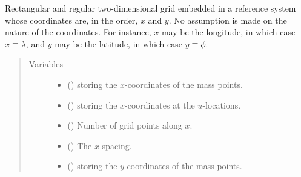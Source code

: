 \documentclass[letterpaper,10pt,english]{sphinxmanual}
\begin{document}
\begin{fulllineitems}
\label{\detokenize{api:grids.grid_xy.GridXY}}
Rectangular and regular two-dimensional grid embedded in a reference system whose coordinates are,
in the order, \(x\) and \(y\). No assumption is made on the nature of the coordinates. For
instance, \(x\) may be the longitude, in which case \(x \equiv \lambda\), and \(y\) may
be the latitude, in which case \(y \equiv \phi\).
\begin{quote}\begin{description}
\item[{Variables}] \leavevmode\begin{itemize}
\item {} 
{\hyperref[\detokenize{api:grids.grid_xyz.GridXYZ.x}]{}} () \textendash{} {\hyperref[\detokenize{api:grids.axis.Axis}]{}} storing the \(x\)-coordinates of the mass points.

\item {} 
{\hyperref[\detokenize{api:grids.grid_xyz.GridXYZ.x_at_u_locations}]{}} () \textendash{} {\hyperref[\detokenize{api:grids.axis.Axis}]{}} storing the \(x\)-coordinates at the \(u\)-locations.

\item {} 
{\hyperref[\detokenize{api:grids.grid_xyz.GridXYZ.nx}]{}} () \textendash{} Number of grid points along \(x\).

\item {} 
{\hyperref[\detokenize{api:grids.grid_xyz.GridXYZ.dx}]{}} () \textendash{} The \(x\)-spacing.

\item {} 
{\hyperref[\detokenize{api:grids.grid_xyz.GridXYZ.y}]{}} () \textendash{} {\hyperref[\detokenize{api:grids.axis.Axis}]{}} storing the \(y\)-coordinates of the mass points.


\end{itemize}
\end{description}
\end{quote}
\end{fulllineitems}
\end{document}
